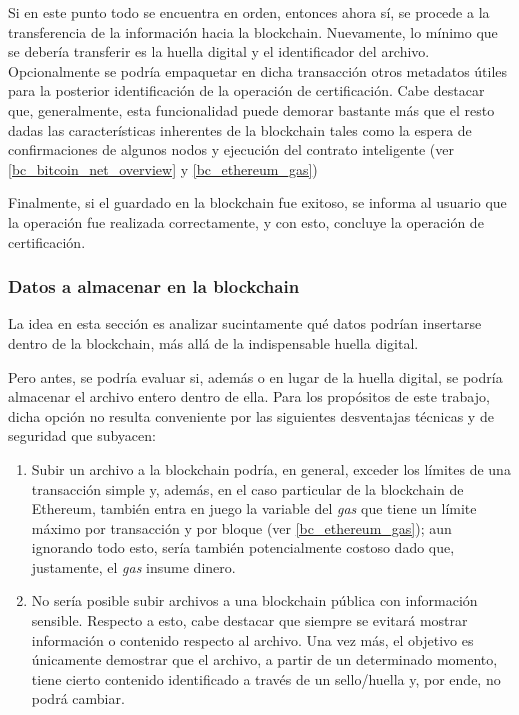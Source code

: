 Si en este punto todo se encuentra en orden, entonces ahora sí, se procede a la transferencia de la información hacia la blockchain. Nuevamente, lo mínimo que se debería transferir es la huella digital y el identificador del archivo. Opcionalmente se podría empaquetar en dicha transacción otros metadatos útiles para la posterior identificación de la operación de certificación. Cabe destacar que, generalmente, esta funcionalidad puede demorar bastante más que el resto dadas las características inherentes de la blockchain tales como la espera de confirmaciones de algunos nodos y ejecución del contrato inteligente (ver \ref{bc_bitcoin_net_overview} y \ref{bc_ethereum_gas})

Finalmente, si el guardado en la blockchain fue exitoso, se informa al usuario que la operación fue realizada correctamente, y con esto, concluye la operación de certificación.

\subsubsection{Datos a almacenar en la blockchain}
\label{datos_guardar_blockchain}

La idea en esta sección es analizar sucintamente qué datos podrían insertarse dentro de la blockchain, más allá de la indispensable huella digital.

Pero antes, se podría evaluar si, además o en lugar de la huella digital, se podría almacenar el archivo entero dentro de ella. Para los propósitos de este trabajo, dicha opción no resulta conveniente por las siguientes desventajas técnicas y de seguridad que subyacen:

\begin{enumerate}
  \item Subir un archivo a la blockchain podría, en general, exceder los límites de una transacción simple y, además, en el caso particular de la blockchain de Ethereum, también entra en juego la variable del \textit{gas} que tiene un límite máximo por transacción y por bloque (ver \ref{bc_ethereum_gas}); aun ignorando todo esto, sería también potencialmente costoso dado que, justamente, el \textit{gas} insume dinero.
  \item No sería posible subir archivos a una blockchain pública con información sensible. Respecto a esto, cabe destacar que siempre se evitará mostrar información o contenido respecto al archivo. Una vez más, el objetivo es únicamente demostrar que el archivo, a partir de un determinado momento, tiene cierto contenido identificado a través de un sello/huella y, por ende, no podrá cambiar.
\end{enumerate}

